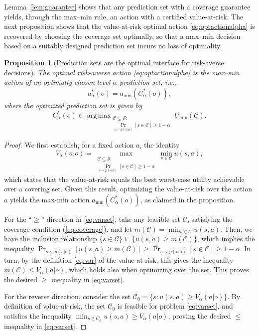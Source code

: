 \documentclass[journal]{IEEEtran}
\newtheorem{proposition}{Proposition}
\theoremstyle{definition}
\theoremstyle{remark}
\newcommand{\Sset}{\mathcal{S}}
\DeclareMathOperator*{\argmax}{arg\,max}
\begin{document}
Lemma~\ref{lem:guarantee} shows that {any} prediction set with a
coverage guarantee yields, through the max--min rule, an action with a
certified value-at-risk. The next proposition shows that the value-at-risk
optimal action \eqref{eq:optactionalpha} is recovered by choosing the
coverage set optimally, so that a max--min decision based on a suitably
designed prediction set incurs no loss of optimality. 

\begin{proposition}[Prediction sets are the optimal interface for risk-averse decisions]
\label{prop:ra}
The optimal risk-averse action \eqref{eq:optactionalpha} is the max--min
action of an optimally chosen level-$\alpha$ prediction set, i.e., 
\begin{equation}
\label{eq:raset}
a_\alpha^*(o)=a_{\mathrm{mm}}\!\left(C_\alpha^*(o)\right),
\end{equation}
where the optimized prediction set is given by
\begin{equation}
\label{eq:optset}
C_\alpha^*(o)\in\!\!\argmax_{\substack{\mathcal{C}\subseteq\Sset:\\ \Pr_{s\sim p(s| o)}[s\in \mathcal{C}]\ge 1-\alpha}}\!\!U_{\mathrm{mm}}(\mathcal{C}).
\end{equation}
\end{proposition}
\begin{proof}
We first establish, for a fixed action $a$, the identity
\begin{equation}
\label{eq:varset}
V_\alpha(a| o)=\!\!\max_{\substack{\mathcal{C}\subseteq\Sset:\\ \Pr_{s\sim p(s| o)}[s\in \mathcal{C}]\ge 1-\alpha}}\!\!\min_{s\in \mathcal{C}}u(s,a),
\end{equation}
which states that the value-at-risk equals the best worst-case utility achievable over a
covering set. Given this result, optimizing the value-at-risk over the action $a$ yields the max-min action $a_{\mathrm{mm}}\!\left(C_\alpha^*(o)\right)$, as claimed in the proposition. 

For the ``$\ge$'' direction in \eqref{eq:varset}, take any
feasible set $\mathcal{C}$, satisfying the coverage condition (\ref{eq:coverage}), and let $m(\mathcal C)=\min_{s\in \mathcal{C}}u(s,a)$. Then, we have the inclusion relationship 
$\{s\in \mathcal{C}\}\subseteq\{u(s,a)\ge m(\mathcal C)\}$, which implies the inequality 
$\Pr_{s\sim p(s| o)}[u(s,a)\ge m(\mathcal C)]\ge\Pr_{s\sim p(s| o)}[s\in \mathcal{C}]\ge1-\alpha$. In turn,  by the
definition \eqref{eq:var} of the value-at-risk, this gives the inequality 
$m(\mathcal{C})\le V_\alpha(a| o)$, which holds also when optimizing over the set. This proves the desired  $\ge$ inequality in \eqref{eq:varset}.

For the reverse direction, consider the set
$\mathcal{C}_0=\{s:u(s,a)\ge V_\alpha(a|o)\}$. By definition of value-at-risk, the set $\mathcal{C}_0$ is  feasible for problem \eqref{eq:varset}, and
satisfies the inequality $\min_{s\in C_0}u(s,a)\ge V_\alpha(a|o)$, proving the desired $\le$ inequality in \eqref{eq:varset}.


\end{proof}
\end{document}
